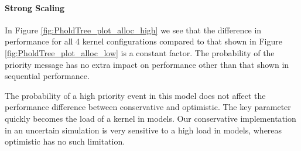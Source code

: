 \paragraph*{Strong Scaling}\label{pholdtreestrongscale}
In Figure \ref{fig:PholdTree_plot_alloc_high} we see that the difference in performance for all 4 kernel configurations compared to that shown in Figure \ref{fig:PholdTree_plot_alloc_low} is a constant factor. The probability of the priority message has no extra impact on performance other than that shown in sequential performance.

The probability of a high priority event in this model does not affect the performance difference between conservative and optimistic. The key parameter quickly becomes the load of a kernel in models. Our conservative implementation in an uncertain simulation is very sensitive to a high load in models, whereas optimistic has no such limitation.

